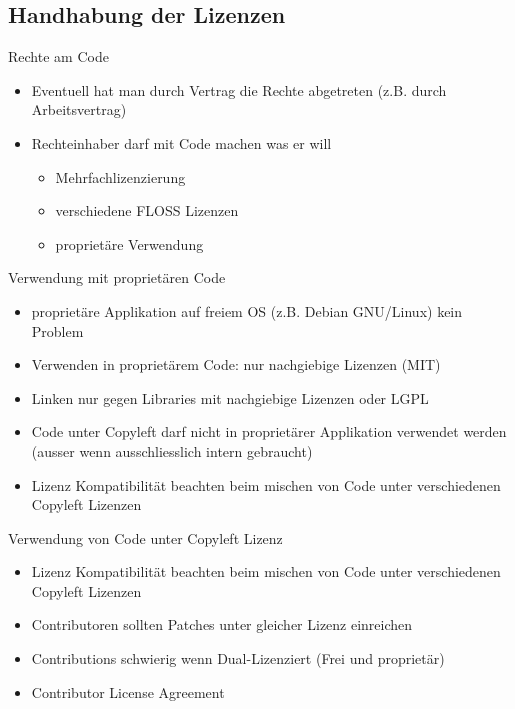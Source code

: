 \subsection{Handhabung der Lizenzen}
\subsectionframe

\begin{frame}{Rechte am Code}
	\begin{itemize}
		\item Eventuell hat man durch Vertrag die Rechte abgetreten (z.B. durch Arbeitsvertrag)
		\item Rechteinhaber darf mit Code machen was er will
		\begin{itemize}
			\item Mehrfachlizenzierung
			\item verschiedene FLOSS Lizenzen
			\item proprietäre Verwendung
		\end{itemize}
	\end{itemize}
\end{frame}

\begin{frame}{Verwendung mit proprietären Code}
	\begin{itemize}
		\item proprietäre Applikation auf freiem OS (z.B. Debian GNU/Linux) kein Problem
		\item Verwenden in proprietärem Code: nur nachgiebige Lizenzen (MIT)
		\item Linken nur gegen Libraries mit nachgiebige Lizenzen oder LGPL
		\item Code unter Copyleft darf nicht in proprietärer Applikation verwendet werden (ausser wenn ausschliesslich intern gebraucht)
		\item Lizenz Kompatibilität beachten beim mischen von Code unter verschiedenen Copyleft Lizenzen
	\end{itemize}
\end{frame}

\begin{frame}{Verwendung von Code unter Copyleft Lizenz}
	\begin{itemize}
		\item Lizenz Kompatibilität beachten beim mischen von Code unter verschiedenen Copyleft Lizenzen
		\item Contributoren sollten Patches unter gleicher Lizenz einreichen
		\item Contributions schwierig wenn Dual-Lizenziert (Frei und proprietär)
		\item Contributor License Agreement
	\end{itemize}
\end{frame}


